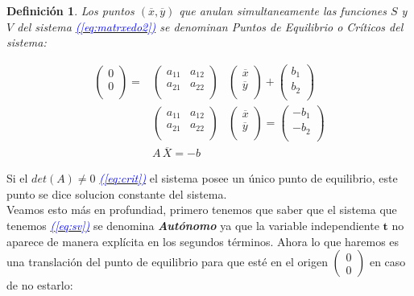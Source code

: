 \documentclass[12pt,a4paper]{report} %
\newtheorem{definicion}{Definición}[chapter] %
\newcommand{\eref}[1]{\hyperref[#1]{\textcolor{blue}{\textit{(\ref*{#1})}}}}
\begin{document}
	\begin{definicion}
		Los puntos $(\overline{x},\overline{y})$ que anulan simultaneamente las funciones $S$ y $V$ del sistema \eref{eq:matrxedo2} se denominan Puntos de Equilibrio o Críticos del sistema:
	\end{definicion}

	\begin{eqnarray}
		\label{eq:crit}
			\begin{pmatrix}
				0\\
				0\\
			\end{pmatrix} =
			&\begin{pmatrix}
				a_{11} & a_{12}\\
				a_{21} & a_{22}\\
			\end{pmatrix}&
			\begin{pmatrix}
				\overline{x}\\
				\overline{y}\\
			\end{pmatrix} + 
			\begin{pmatrix}
				b_1\\
				b_2\\
			\end{pmatrix}\nonumber \\[4mm]
			&\begin{pmatrix}
			a_{11} & a_{12}\\
			a_{21} & a_{22}\\
			\end{pmatrix}&
			\begin{pmatrix}
			\overline{x}\\
			\overline{y}\\
			\end{pmatrix} = 
			\begin{pmatrix}
			-b_1\\
			-b_2\\
			\end{pmatrix} \nonumber \\[4mm]
			&A\,\overline{X}=-b
	\end{eqnarray}\smallskip
	
	Si el $det(A)\neq0$ \eref{eq:crit} el sistema posee un único punto de equilibrio, este punto se dice solucion constante del sistema.
    \\[0.5cm]
    Veamos esto más en profundiad, primero tenemos que saber que el sistema que tenemos \eref{eq:sv} se denomina \textit{\textbf{Autónomo}} ya que la variable independiente $\bm{t}$ no aparece de manera explícita en los segundos términos.
    \newpage
    Ahora lo que haremos es una translación del punto de equilibrio para que esté en el origen $\begin{pmatrix} 0 \\ 0
    \end{pmatrix}$ en caso de no estarlo:
    
\end{document}
